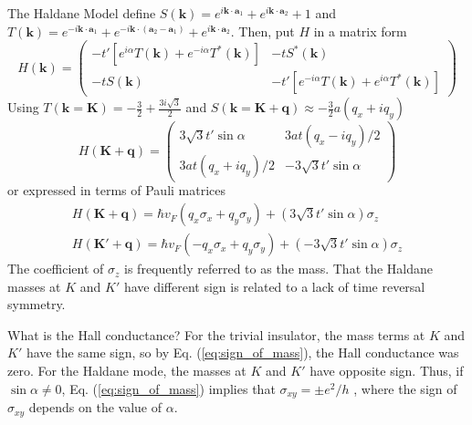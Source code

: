 \documentclass[a4paper,12pt]{article}
\renewcommand{\vec}[1]{\boldsymbol{\mathbf{#1}}}
\begin{document}
\begin{section}{The Haldane Model}
define $S(\vec{k})=e^{i \vec{k} \cdot \vec{a}_1}+e^{i \vec{k} \cdot \vec{a}_2} +1$ and $T(\vec{k})=e^{-i \vec{k} \cdot \vec{a}_1} +  e^{-i \vec{k} \cdot (\vec{a}_2-\vec{a}_1)} +  e^{i \vec{k} \cdot \vec{a}_2}$.  Then, put $H$ in a matrix form
\begin{equation}
H(\vec{k})= \left(
\begin{array}{cc}
-t'[e^{i \alpha} T(\vec{k})+e^{-i \alpha} T^*(\vec{k})] & -tS^*(\vec{k}) \\
-tS(\vec{k}) & -t'[e^{-i \alpha} T(\vec{k})+e^{i \alpha} T^*(\vec{k})]
\end{array}
\right)
\end{equation}
Using $T(\vec{k}=\vec{K})=-\frac{3}{2}+\frac{3i \sqrt{3}}{2}$ and $S(\vec{k}=\vec{K}+\vec{q}) \approx -\frac{3}{2}a(q_x+i q_y)$
\begin{equation}
H(\vec{K}+\vec{q})= \left(
\begin{array}{cc}
3 \sqrt{3} t' \sin{\alpha} & 3at(q_x - i q_y)/2 \\
3at(q_x + i q_y)/2 & -3 \sqrt{3} t' \sin{\alpha}
\end{array}
\right)
\end{equation}
or expressed in terms of Pauli matrices
\begin{eqnarray}
H(\vec{K}+\vec{q})=\hbar v_F (q_x \sigma_x + q_y \sigma_y)+(3 \sqrt{3} t' \sin{\alpha})\sigma_z \\
H(\vec{K'}+\vec{q})=\hbar v_F (-q_x \sigma_x + q_y \sigma_y)+(-3 \sqrt{3} t' \sin{\alpha})\sigma_z
\end{eqnarray}
The coefficient of $\sigma_z$ is frequently referred to as the mass.  That the Haldane masses at $K$ and $K'$ have different sign is related to a lack of time reversal symmetry.

What is the Hall conductance?  For the trivial insulator, the mass terms at $K$ and $K'$ have the same sign, so by Eq. (\ref{eq:sign_of_mass}), the Hall conductance was zero.  For the Haldane mode, the masses at $K$ and $K'$ have opposite sign.  Thus, if $\sin{\alpha} \ne 0$, Eq. (\ref{eq:sign_of_mass}) implies that $\sigma_{xy}= \pm e^2/h$
, where the sign of $\sigma_{xy}$ depends on the value of $\alpha$.

\end{section}
\end{document}
